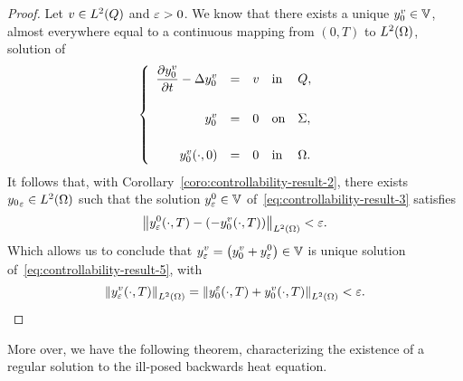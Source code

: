 \begin{proof}%
    Let $v\in L^{2}\!\left({Q}\right)$ and $\varepsilon > 0$. We know that there exists a unique
    $y_{0}^{v}\in \mathbb{V}$, almost everywhere equal to a continuous mapping
    from $(0,T)$ to $L^{2}\!\left({\Omega}\right)$, solution of
    \begin{equation*}\label{eq:controllability-proof-39}
        \begin{cases}\displaystyle
            \begin{array}{rclll}
                \dfrac{\partial{}y_{0}^{v}}{\partial{}t} - \Delta y_{0}^{v} & = & v &
                \text{in} & Q,\\
                \\
                y_{0}^{v} & = & 0 & \text{on} & \Sigma,\\
                \\
                y_{0}^{v}\!\left({\cdot,0}\right) & = & 0 & \text{in} &
                \Omega.
            \end{array}
        \end{cases}
    \end{equation*}
    It follows that, with Corollary~\ref{coro:controllability-result-2},
    there exists ${y_{0}}_{\varepsilon}\in L^{2}\!\left({\Omega}\right)$ such that the solution
    $y_{\varepsilon}^{0}\in \mathbb{V}$ of~\eqref{eq:controllability-result-3}
    satisfies
    \begin{equation*}\label{eq:controllability-proof-40}
        \normeohm{%
            y_{\veps}^{0}\!\left({\cdot,T}\right) - \left({%
                -y_{0}^{v}\!\left({\cdot,T}\right)
            }\right)
        } < \veps.
    \end{equation*}
    Which allows us to conclude that $\displaystyle y_{\veps}^{v} =
    \left({%
        y_{0}^{v} + y_{\veps}^{0}
    }\right) \in \Vbb$ is unique solution
    of~\eqref{eq:controllability-result-5}, with
    \begin{equation*}
        \normeohm{y_{\veps}^{v}\!\left({\cdot,T}\right)} = \normeohm{%
            y_{0}^{\veps}\!\left({\cdot,T}\right) +
            y_{0}^{v}\!\left({\cdot,T}\right)
        } < \veps.
    \end{equation*}
\end{proof}

More over, we have the following theorem, characterizing the existence of a
regular solution to the ill-posed backwards heat equation.

